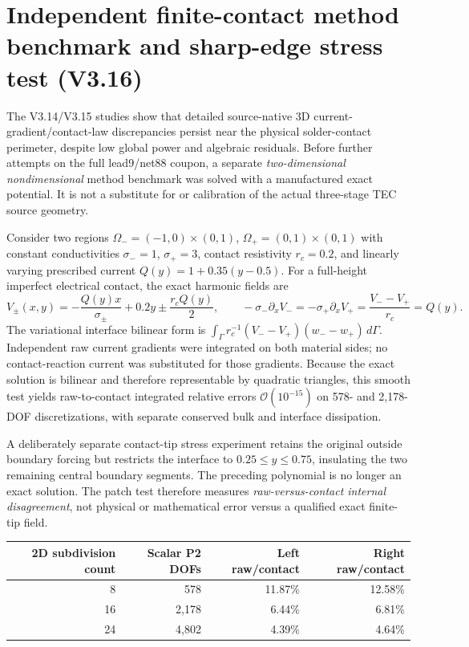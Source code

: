 \section{Independent finite-contact method benchmark and sharp-edge stress test (V3.16)}
\label{sec:v316-method}
The V3.14/V3.15 studies show that detailed source-native 3D current-gradient/contact-law discrepancies persist near the physical solder-contact perimeter, despite low global power and algebraic residuals. Before further attempts on the full lead9/net88 coupon, a separate \emph{two-dimensional nondimensional} method benchmark was solved with a manufactured exact potential. It is not a substitute for or calibration of the actual three-stage TEC source geometry.

Consider two regions \(\Omega_-=(-1,0)\times(0,1)\), \(\Omega_+=(0,1)\times(0,1)\) with constant conductivities \(\sigma_-=1\), \(\sigma_+=3\), contact resistivity \(r_c=0.2\), and linearly varying prescribed current \(Q(y)=1+0.35(y-0.5)\). For a full-height imperfect electrical contact, the exact harmonic fields are
\[
V_{\pm}(x,y)=-\frac{Q(y)x}{\sigma_{\pm}}+0.2y\pm\frac{r_c Q(y)}{2},\qquad
-\sigma_-\partial_x V_-=-\sigma_+\partial_x V_+=\frac{V_--V_+}{r_c}=Q(y).
\]
The variational interface bilinear form is \(\int_{\Gamma}r_c^{-1}(V_--V_+)(w_--w_+)\,d\Gamma\). Independent raw current gradients were integrated on both material sides; no contact-reaction current was substituted for those gradients. Because the exact solution is bilinear and therefore representable by quadratic triangles, this smooth test yields raw-to-contact integrated relative errors \(\mathcal O(10^{-15})\) on 578- and 2,178-DOF discretizations, with separate conserved bulk and interface dissipation.

A deliberately separate contact-tip stress experiment retains the original outside boundary forcing but restricts the interface to \(0.25\leq y\leq 0.75\), insulating the two remaining central boundary segments. The preceding polynomial is no longer an exact solution. The patch test therefore measures \emph{raw-versus-contact internal disagreement}, not physical or mathematical error versus a qualified exact finite-tip field.

\begin{center}\small
\begin{tabular}{rrrr}\toprule
2D subdivision count & Scalar P2 DOFs & Left raw/contact & Right raw/contact\\\midrule
8 & 578 & 11.87\% & 12.58\%\\
16 & 2,178 & 6.44\% & 6.81\%\\
24 & 4,802 & 4.39\% & 4.64\%\\\bottomrule
\end{tabular}
\end{center}

